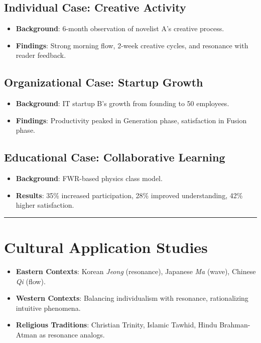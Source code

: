 \documentclass{article}
\begin{document}
\subsection{Individual Case: Creative Activity}
\begin{itemize}
    \item \textbf{Background}: 6-month observation of novelist A’s creative process.
    \item \textbf{Findings}: Strong morning flow, 2-week creative cycles, and resonance with reader feedback.
\end{itemize}

\subsection{Organizational Case: Startup Growth}
\begin{itemize}
    \item \textbf{Background}: IT startup B’s growth from founding to 50 employees.
    \item \textbf{Findings}: Productivity peaked in Generation phase, satisfaction in Fusion phase.
\end{itemize}

\subsection{Educational Case: Collaborative Learning}
\begin{itemize}
    \item \textbf{Background}: FWR-based physics class model.
    \item \textbf{Results}: 35\% increased participation, 28\% improved understanding, 42\% higher satisfaction.
\end{itemize}

\hrule

\section{Cultural Application Studies}
\begin{itemize}
    \item \textbf{Eastern Contexts}: Korean \textit{Jeong} (resonance), Japanese \textit{Ma} (wave), Chinese \textit{Qi} (flow).
    \item \textbf{Western Contexts}: Balancing individualism with resonance, rationalizing intuitive phenomena.
    \item \textbf{Religious Traditions}: Christian Trinity, Islamic Tawhid, Hindu Brahman-Atman as resonance analogs.
\end{itemize}
\end{document}
